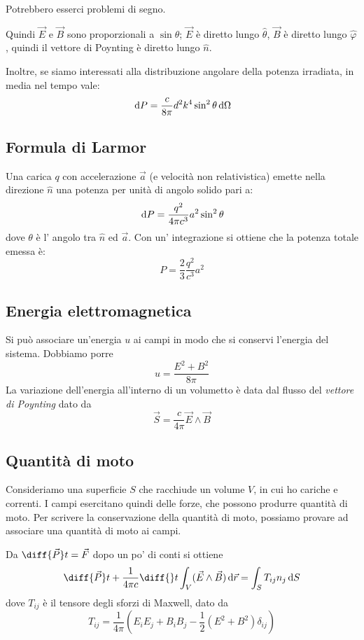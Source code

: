 \documentclass[a4paper,10pt,oneside]{math_article}
\renewcommand{\phi}{\varphi }
\begin{document}
			Potrebbero esserci problemi di segno.

			Quindi $\vec E$ e $\vec B$ sono proporzionali a $\sin \theta$; $\vec E$ è diretto lungo $\hat \theta$, $\vec B$ è diretto lungo $\hat \phi$, quindi il vettore di Poynting è diretto lungo $\hat n$.
			
			Inoltre, se siamo interessati alla distribuzione angolare della potenza irradiata, in media nel tempo vale:
			\[
			 \, \textrm{d} P = \frac c{8\pi} d^2k^4\sin^2\theta  \, \textrm{d}\Omega
			\]
		\subsection{Formula di Larmor} Una carica $q$ con accelerazione $\vec a$ (e velocità non relativistica) emette nella direzione $\hat n$ una potenza per unità di angolo solido pari a:
		\[
		\, \textrm{d} P=\frac{q^2}{4\pi c^3}a^2\sin^2 \theta
		\]
		dove $\theta$ è l' angolo tra $\hat n$ ed $\vec a$. Con un' integrazione si ottiene che la potenza totale emessa è:
		\[
		P=\frac{2}{3}\frac{q^2}{c^3} a^2
		\]
		\subsection{Energia elettromagnetica}
			Si può associare un'energia $u$ ai campi in modo che si conservi l'energia del sistema. Dobbiamo porre
			\begin{equation}
				u = \frac {E^2+B^2}{8\pi}
			\end{equation}
			La variazione dell'energia all'interno di un volumetto è data dal flusso del \emph{vettore di Poynting} dato da 
			\begin{equation}
				\vec S=\frac{c}{4\pi} \vec E \wedge \vec B
			\end{equation}


			
		\subsection{Quantità di moto}
			Consideriamo una superficie $S$ che racchiude un volume $V$, in cui ho cariche e correnti. I campi esercitano quindi delle forze, che possono produrre quantità di moto. Per scrivere la conservazione della quantità di moto, possiamo provare ad associare una quantità di moto ai campi.
			
			Da $\diff {\vec P}t = \vec F$  dopo un po' di conti si ottiene 
			\begin{equation}
					\diff {\vec P}t + \frac1{4\pi c}\diff{}t \int_V (\vec E \wedge \vec B) \de\vec r = \int_S T_{ij}n_j \de S
			\end{equation}
			dove $T_{ij}$ è il tensore degli sforzi di Maxwell, dato da 
			\begin{equation}
				T_{ij} = \frac1{4\pi} \left(E_iE_j+B_iB_j - \frac12 (E^2 + B^2) \delta_{ij}\right)
			\end{equation}
			
\end{document}
